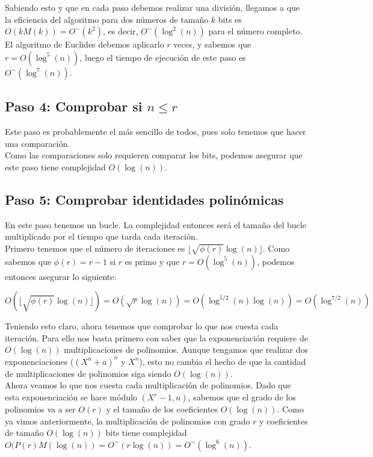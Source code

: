 Sabiendo esto y que en cada paso debemos realizar una división, llegamos a que la eficiencia del algoritmo para dos números de tamaño $k$ bits es $O(kM(k)) = O^\sim(k^2)$, es decir, $O^\sim(\log^2(n))$ para el número completo.\\

El algoritmo de Euclides debemos aplicarlo $r$ veces, y sabemos que $r = O(\log^5(n))$, luego el tiempo de ejecución de este paso es $O^\sim(\log^7(n))$.

\subsection{Paso 4: Comprobar si $n \leq r$}

Este paso es probablemente el más sencillo de todos, pues solo tenemos que hacer una comparación.\\

Como las comparaciones solo requieren comparar los bits, podemos asegurar que este paso tiene complejidad $O(\log(n))$.

\subsection{Paso 5: Comprobar identidades polinómicas}

En este paso tenemos un bucle. La complejidad entonces será el tamaño del bucle multiplicado por el tiempo que tarda cada iteración.\\

Primero tenemos que el número de iteraciones es $\lfloor \sqrt{\phi(r)}\log(n) \rfloor$. Como sabemos que $\phi(r) = r-1$ si $r$ es primo y que $r = O(\log^5(n))$, podemos entonces asegurar lo siguiente:

$$O\left(\lfloor \sqrt{\phi(r)}\log(n) \rfloor\right) = O(\sqrt{r}\log(n)) = O(\log^{5/2}(n)\log(n)) = O(\log^{7/2}(n))$$

Teniendo esto claro, ahora tenemos que comprobar lo que nos cuesta cada iteración. Para ello nos basta primero con saber que la exponenciación requiere de $O(\log(n))$ multiplicaciones de polinomios. Aunque tengamos que realizar dos exponenciaciones ($(X^n + a)^n$ y $X^n$), esto no cambia el hecho de que la cantidad de multiplicaciones de polinomios siga siendo $O(\log(n))$.\\

Ahora veamos lo que nos cuesta cada multiplicación de polinomios. Dado que esta exponenciación se hace módulo $(X^r - 1, n)$, sabemos que el grado de los polinomios va a ser $O(r)$ y el tamaño de los coeficientes $O(\log(n))$. Como ya vimos anteriormente, la multiplicación de polinomios con grado $r$ y coeficientes de tamaño $O(\log(n))$ bits tiene complejidad $O(P(r)M(\log(n)) = O^\sim(r\log(n)) = O^\sim(\log^6(n))$.\\

